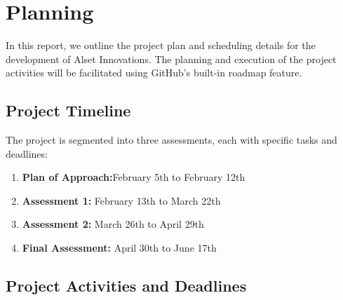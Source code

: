 \section{Planning}





In this report, we outline the project plan and scheduling details for the development of Alset Innovations. The planning and execution of the project activities will be facilitated using GitHub's built-in roadmap feature. 

\subsection{Project Timeline}

The project is segmented into three assessments, each with specific tasks and deadlines:

\begin{enumerate}
    \item \textbf{Plan of Approach:}February 5th to February 12th
    \item \textbf{Assessment 1:} February 13th to March 22th
    \item \textbf{Assessment 2:} March 26th to April 29th
    \item \textbf{Final Assessment:} April 30th to June 17th
\end{enumerate}

\subsection{Project Activities and Deadlines}

